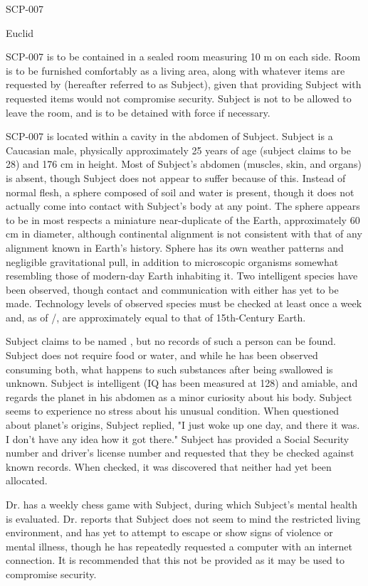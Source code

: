  SCP-007

 Euclid

 SCP-007 is to be contained in a sealed room measuring 10 m on each side. Room is to be furnished comfortably as a living area, along with whatever items are requested by  (hereafter referred to as Subject), given that providing Subject with requested items would not compromise security. Subject is not to be allowed to leave the room, and is to be detained with force if necessary.

 SCP-007 is located within a cavity in the abdomen of Subject. Subject is a Caucasian male, physically approximately 25 years of age (subject claims to be 28) and 176 cm in height. Most of Subject's abdomen (muscles, skin, and organs) is absent, though Subject does not appear to suffer because of this. Instead of normal flesh, a sphere composed of soil and water is present, though it does not actually come into contact with Subject's body at any point. The sphere appears to be in most respects a miniature near-duplicate of the Earth, approximately 60 cm in diameter, although continental alignment is not consistent with that of any alignment known in Earth's history. Sphere has its own weather patterns and negligible gravitational pull, in addition to microscopic organisms somewhat resembling those of modern-day Earth inhabiting it. Two intelligent species have been observed, though contact and communication with either has yet to be made. Technology levels of observed species must be checked at least once a week and, as of /, are approximately equal to that of 15th-Century Earth.

Subject claims to be named , but no records of such a person can be found. Subject does not require food or water, and while he has been observed consuming both, what happens to such substances after being swallowed is unknown. Subject is intelligent (IQ has been measured at 128) and amiable, and regards the planet in his abdomen as a minor curiosity about his body. Subject seems to experience no stress about his unusual condition. When questioned about planet's origins, Subject replied, "I just woke up one day, and there it was. I don't have any idea how it got there." Subject has provided a Social Security number and driver's license number and requested that they be checked against known records. When checked, it was discovered that neither had yet been allocated.

Dr.  has a weekly chess game with Subject, during which Subject's mental health is evaluated. Dr.  reports that Subject does not seem to mind the restricted living environment, and has yet to attempt to escape or show signs of violence or mental illness, though he has repeatedly requested a computer with an internet connection. It is recommended that this not be provided as it may be used to compromise security.
